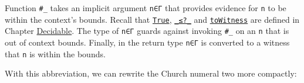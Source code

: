 \begin{fence}
\begin{code}%
\>[0]\AgdaOperator{\AgdaFunction{\#\AgdaUnderscore{}}}\AgdaSpace{}%
\AgdaSymbol{:}\AgdaSpace{}%
\AgdaSpace{}%
\AgdaSymbol{\{}\AgdaSymbol{\}}\<%
\\
\>[0][@{}l@{\AgdaIndent{0}}]%
\>[2]\AgdaSpace{}%
\AgdaSymbol{(}\AgdaSpace{}%
\AgdaSymbol{:}\AgdaSpace{}%
\AgdaSymbol{)}\<%
\\
%
\>[2]%
\>[420I]\AgdaSymbol{\{}\AgdaSpace{}%
\AgdaSymbol{:}\AgdaSpace{}%
\AgdaSpace{}%
\AgdaSymbol{(}\AgdaSpace{}%
\AgdaSpace{}%
\AgdaSpace{}%
\AgdaSpace{}%
\AgdaSymbol{)\}}\<%
\\
\>[.][@{}l@{}]\<[420I]%
\>[4]\AgdaComment{--------------------------------}\<%
\\
%
\>[2]\AgdaSpace{}%
\AgdaSpace{}%
\AgdaSpace{}%
\AgdaSpace{}%
\AgdaSymbol{(}\AgdaSpace{}%
\AgdaSymbol{)}\<%
\\
\>[0]\AgdaOperator{\AgdaFunction{\#\AgdaUnderscore{}}}\AgdaSpace{}%
\AgdaSpace{}%
\AgdaSymbol{\{}\AgdaSymbol{\}}%
\>[12]\AgdaSymbol{=}%
\>[15]\AgdaSpace{}%
\AgdaSpace{}%
\AgdaSymbol{(}\AgdaSpace{}%
\AgdaSymbol{)}\<%
\end{code}
\end{fence}

Function \texttt{\#\_} takes an implicit argument \texttt{n∈Γ} that
provides evidence for \texttt{n} to be within the context's bounds.
Recall that
\protect\hyperlink{Decidable-proof-by-reflection}{\texttt{True}},
\protect\hyperlink{Decidable-the-best-of-both-worlds}{\texttt{\_≤?\_}}
and
\protect\hyperlink{Decidable-decidables-from-booleans-and-booleans-from-decidables}{\texttt{toWitness}}
are defined in Chapter \protect\hyperlink{Decidable}{Decidable}. The
type of \texttt{n∈Γ} guards against invoking \texttt{\#\_} on an
\texttt{n} that is out of context bounds. Finally, in the return type
\texttt{n∈Γ} is converted to a witness that \texttt{n} is within the
bounds.

With this abbreviation, we can rewrite the Church numeral two more
compactly:


